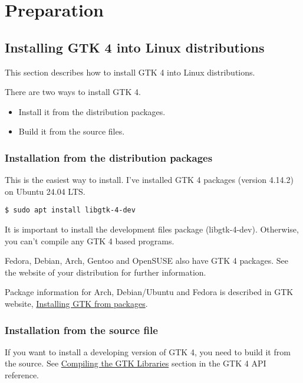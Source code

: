 \section{Preparation}\label{preparation}

\subsection{Installing GTK 4 into Linux
distributions}\label{installing-gtk-4-into-linux-distributions}

This section describes how to install GTK 4 into Linux distributions.

There are two ways to install GTK 4.

\begin{itemize}
\tightlist
\item
  Install it from the distribution packages.
\item
  Build it from the source files.
\end{itemize}

\subsubsection{Installation from the distribution
packages}\label{installation-from-the-distribution-packages}

This is the easiest way to install. I've installed GTK 4 packages
(version 4.14.2) on Ubuntu 24.04 LTS.

\begin{lstlisting}
$ sudo apt install libgtk-4-dev
\end{lstlisting}

It is important to install the development files package (libgtk-4-dev).
Otherwise, you can't compile any GTK 4 based programs.

Fedora, Debian, Arch, Gentoo and OpenSUSE also have GTK 4 packages. See
the website of your distribution for further information.

Package information for Arch, Debian/Ubuntu and Fedora is described in
GTK website,
\href{https://www.gtk.org/docs/installations/linux\#installing-gtk-from-packages}{Installing
GTK from packages}.

\subsubsection{Installation from the source
file}\label{installation-from-the-source-file}

If you want to install a developing version of GTK 4, you need to build
it from the source. See
\href{https://docs.gtk.org/gtk4/building.html}{Compiling the GTK
Libraries} section in the GTK 4 API reference.

